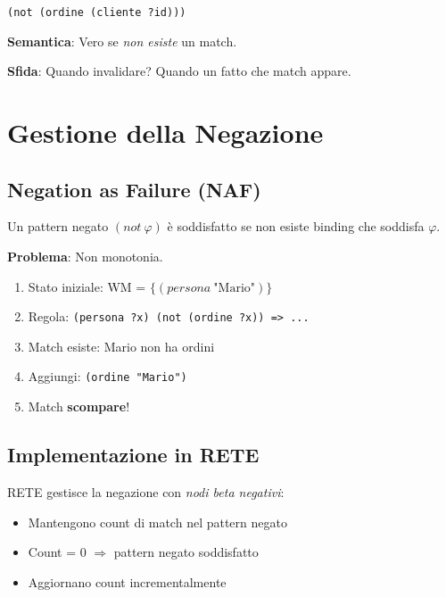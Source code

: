 \begin{lstlisting}[language=CLIPS]
(not (ordine (cliente ?id)))
\end{lstlisting}

\textbf{Semantica}: Vero se \textit{non esiste} un match.

\textbf{Sfida}: Quando invalidare? Quando un fatto che match appare.

\section{Gestione della Negazione}

\subsection{Negation as Failure (NAF)}

\begin{definizione}[NAF]
Un pattern negato $(not~\varphi)$ è soddisfatto se non esiste binding che soddisfa $\varphi$.
\end{definizione}

\textbf{Problema}: Non monotonia.

\begin{esempio}
\begin{enumerate}
\item Stato iniziale: WM = $\{(persona~\text{"Mario"})\}$
\item Regola: \texttt{(persona ?x) (not (ordine ?x)) => ...}
\item Match esiste: Mario non ha ordini
\item Aggiungi: \texttt{(ordine "Mario")}
\item Match \textbf{scompare}!
\end{enumerate}
\end{esempio}

\subsection{Implementazione in RETE}

RETE gestisce la negazione con \textit{nodi beta negativi}:

\begin{itemize}
\item Mantengono count di match nel pattern negato
\item Count = 0 $\Rightarrow$ pattern negato soddisfatto
\item Aggiornano count incrementalmente
\end{itemize}

